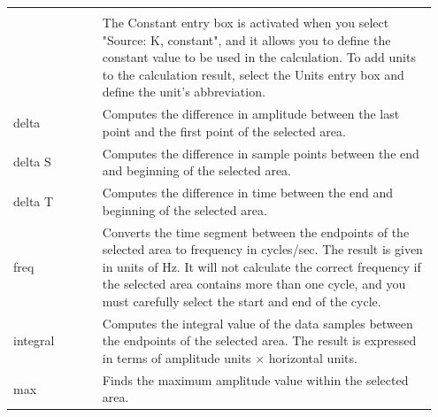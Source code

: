 \documentclass{article}
\begin{document}
\begin{table}[h!]
\begin{tabular}[h!]{p{0.2\linewidth}p{0.75\linewidth}}
	& \\
	& The Constant entry box is activated when you select "Source: K, constant", and it allows you to define the constant value to be used in the calculation. To add units to the calculation result, select the Units entry box and define the unit's abbreviation.\\
\midrule
delta & Computes the difference in amplitude between the last point and the first point of the selected area.\\
\midrule
delta S & Computes the difference in sample points between the end and beginning of the selected area.\\
\midrule
delta T & Computes the difference in time between the end and beginning of the selected area.\\
\midrule
freq & Converts the time segment between the endpoints of the selected area to frequency in cycles/sec. The result is given in units of Hz. It will not calculate the correct frequency if the selected area contains more than one cycle, and you must carefully select the start and end of the cycle.\\
\midrule
integral & Computes the integral value of the data samples between the endpoints of the selected area. The result is expressed in terms of amplitude units $\times$ horizontal units.\\
\midrule
max & Finds the maximum amplitude value within the selected area.\\
\bottomrule
\end{tabular}
\end{table}
\end{document}
